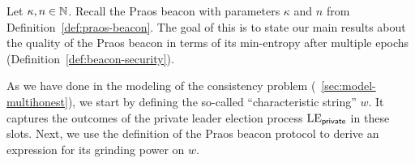 

Let $\kappa, n \in \mathbb{N}$. 
Recall the Praos beacon with parameters $\kappa$ and $n$ from Definition~\ref{def:praos-beacon}. 
The goal of this \Section is to state our main results 
about the quality of the Praos beacon 
in terms of its min-entropy after multiple epochs (Definition~\ref{def:beacon-security}).

As we have done in the modeling of the consistency problem 
(\Section~\ref{sec:model-multihonest}), 
we start by defining the so-called ``characteristic string'' $w$. 
It captures the outcomes of the private leader election process $\mathrm{LE}_\mathsf{private}$ 
in these slots. 
Next, we use the definition of the Praos beacon protocol to 
derive an expression for its grinding power on $w$.




\newcommand{\Suffix}[2]{ \mathsf{suffix}({#1},{#2})}
\newcommand{\CoinTossingLC}{\Pi_\mathsf{lc}^{\Players(\alpha),k,n}}






